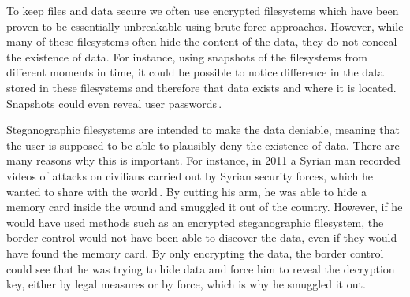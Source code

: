 


To keep files and data secure we often use encrypted filesystems which have been proven to be essentially unbreakable using brute-force approaches. However, while many of these filesystems often hide the content of the data, they do not conceal the existence of data. For instance, using snapshots of the filesystems from different moments in time, it could be possible to notice difference in the data stored in these filesystems and therefore that data exists and where it is located. Snapshots could even reveal user passwords\,\cite{hanMultiuserSteganographicFile2010}.

Steganographic filesystems are intended to make the data deniable, meaning that the user is supposed to be able to plausibly deny the existence of data. There are many reasons why this is important. For instance, in 2011 a Syrian man recorded videos of attacks on civilians carried out by Syrian security forces, which he wanted to share with the world\,\cite{westheadHowSyrianRefugee2012}. By cutting his arm, he was able to hide a memory card inside the wound and smuggled it out of the country. However, if he would have used methods such as an encrypted steganographic filesystem, the border control would not have been able to discover the data, even if they would have found the memory card. By only encrypting the data, the border control could see that he was trying to hide data and force him to reveal the decryption key, either by legal measures or by force, which is why he smuggled it out.

